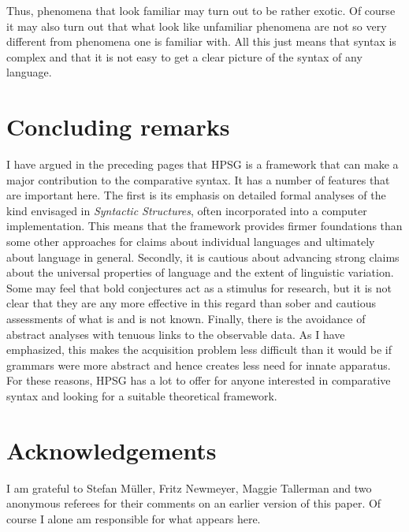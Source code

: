 \documentclass[output=paper]{langsci/langscibook}
\begin{document}
Thus, phenomena that look familiar may turn out to be rather exotic. Of course
it may also turn out that what look like unfamiliar phenomena are not so very
different from phenomena one is familiar with. All this just means that syntax
is complex and that it is not easy to get a clear picture of the syntax of any
language.

\section{Concluding remarks}\label{sec-5:conclusions}

I have argued in the preceding pages that \gls{HPSG} is a framework that can
make a major contribution to the comparative syntax. It has a number of
features that are important here. The first is its emphasis on detailed formal
analyses of the kind envisaged in \emph{Syntactic Structures}, often
incorporated into a computer implementation. This means that the framework
provides firmer foundations than some other approaches for claims about
individual languages and ultimately about language in general. Secondly, it is
cautious about advancing strong claims about the universal properties of
language and the extent of linguistic variation. Some may feel that bold
conjectures act as a stimulus for research, but it is not clear that they are
any more effective in this regard than sober and cautious assessments of what
is and is not known. Finally, there is the avoidance of abstract analyses with
tenuous links to the observable data. As I have emphasized, this makes the
acquisition problem less difficult than it would be if grammars were more
abstract and hence creates less need for innate apparatus. For these reasons,
\gls{HPSG} has a lot to offer for anyone interested in comparative syntax and
looking for a suitable theoretical framework.\largerpage[2]

\printchapterglossary{}

\section*{Acknowledgements}

I am grateful to Stefan Müller, Fritz Newmeyer, Maggie Tallerman and two
anonymous referees for their comments on an earlier version of this paper. Of
course I alone am responsible for what appears here.

{\sloppy
\printbibliography[heading=subbibliography,notkeyword=this]
}
\end{document}
